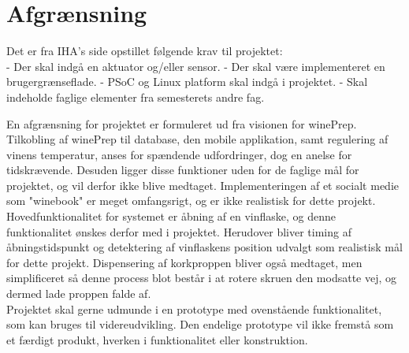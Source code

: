 \chapter{Afgrænsning}
Det er fra IHA's side opstillet følgende krav til projektet:\\
- Der skal indgå en aktuator og/eller sensor.
- Der skal være implementeret en brugergrænseflade.
- PSoC og Linux platform skal indgå i projektet.
- Skal indeholde faglige elementer fra semesterets andre fag.

En afgrænsning for projektet er formuleret ud fra visionen for winePrep. Tilkobling af winePrep til database, den mobile applikation, samt regulering af vinens 
temperatur, anses for spændende udfordringer, dog en anelse for tidskrævende. Desuden ligger disse funktioner uden for de faglige mål for projektet, og vil 
derfor ikke blive medtaget. Implementeringen af et socialt medie som "winebook" er meget omfangsrigt, og er ikke realistisk for dette projekt.\\

Hovedfunktionalitet for systemet er åbning af en vinflaske, og denne funktionalitet ønskes derfor med i projektet. Herudover bliver timing af åbningstidspunkt 
og detektering af vinflaskens position udvalgt som realistisk mål for dette projekt. Dispensering af korkproppen bliver også medtaget, men simplificeret så denne
process blot består i at rotere skruen den modsatte vej, og dermed lade proppen falde af.\\

Projektet skal gerne udmunde i en prototype med ovenstående funktionalitet, som kan bruges til videreudvikling. Den endelige prototype vil ikke fremstå som et 
færdigt produkt, hverken i funktionalitet eller konstruktion. 

    